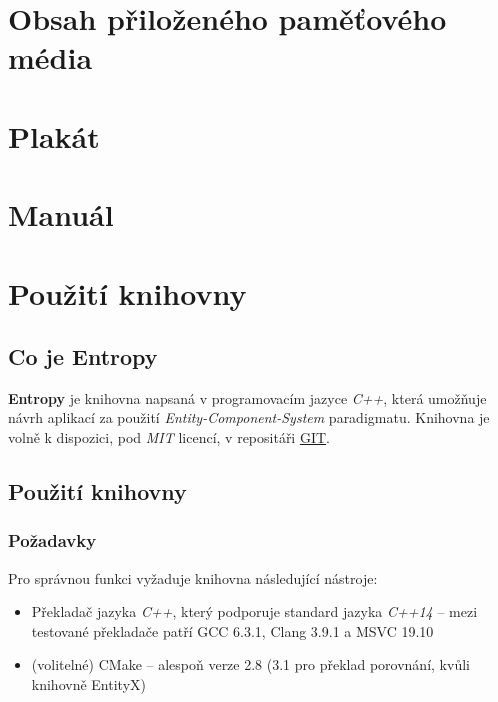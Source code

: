 
\chapter{Obsah přiloženého paměťového média}

\chapter{Plakát}

\chapter{Manuál}

\chapter{Použití knihovny}

\section*{Co je Entropy}

\textbf{Entropy} je knihovna napsaná v programovacím jazyce \emph{C++}, která umožňuje návrh aplikací za použití \emph{Entity-Component-System} paradigmatu. Knihovna je volně k dispozici, pod \emph{MIT} licencí, v repositáři \href{https://github.com/T0mt0mp/Entropy}{GIT}. 

\section*{Použití knihovny}

\subsection*{Požadavky}

Pro správnou funkci vyžaduje knihovna následující nástroje: 
\begin{itemize}
	\item Překladač jazyka \emph{C++}, který podporuje standard jazyka \emph{C++14} -- mezi testované překladače patří GCC 6.3.1, Clang 3.9.1 a MSVC 19.10
	\item (volitelné) CMake -- alespoň verze 2.8 (3.1 pro překlad porovnání, kvůli knihovně EntityX)
\end{itemize}

